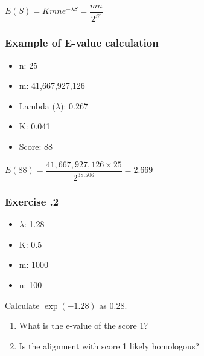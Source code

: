 $E(S) = Kmne^{-λS} = \dfrac{mn}{2^{S'}}$\\

%
%
\subsubsection*{Example of E-value calculation} 
\begin{itemize}
\item n: 25
\item m: 41,667,927,126
\item Lambda ($\lambda$): 0.267
\item K: 0.041
\item Score: 88
\end{itemize}

$E(88) = \dfrac{41,667,927,126 \times 25}{2^{38.506}} = 2.669$\\

%
%
\subsubsection*{Exercise \thesection.2}

\begin{itemize}
\item $\lambda$: 1.28
\item K: 0.5
\item m: 1000
\item n: 100
\end{itemize}

Calculate $\exp(-1.28)$ as 0.28.

\begin{enumerate}
\item What is the e-value of the score 1? 
\bigskip 
\item Is the alignment with score 1 likely homologous?
\end{enumerate}

\bigskip 

%
